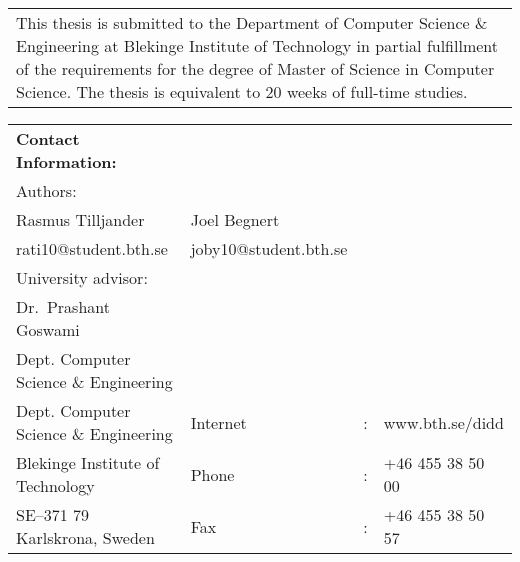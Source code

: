 \documentclass[a4paper,oneside]{bth}
\begin{document}
{\pagestyle{empty}
\changepage{5cm}{1cm}{-0.5cm}{-0.5cm}{}{-2cm}{}{}{}
\noindent%
\begin{tabular}{p{\textwidth}}
{\small This thesis is submitted to the Department of Computer Science \& Engineering at Blekinge
Institute of Technology in partial fulfillment of the requirements for the degree of Master
of Science in Computer Science. The thesis is equivalent to 20 weeks of
full-time studies.}
\end{tabular}

\par\vspace {12cm}

\noindent%
\begin{tabular}{p{}lcl}
\textbf{Contact Information:}\\
Authors:\\
Rasmus Tilljander               & Joel Begnert\\
rati10@student.bth.se   & joby10@student.bth.se\\
\par\vspace {5cm}
University advisor:\\
Dr.\ Prashant Goswami\\
Dept. Computer Science \& Engineering
\par\vspace {1cm}
\noindent%
 \\
Dept. Computer Science \& Engineering & Internet & : & www.bth.se/didd\\
Blekinge Institute of Technology & Phone	& : & +46 455 38 50 00 \\
SE--371 79 Karlskrona, Sweden & Fax & : & +46 455 38 50 57 \\
\end{tabular}
\clearpage
} %

\setcounter{page}{1}

\end{document}
